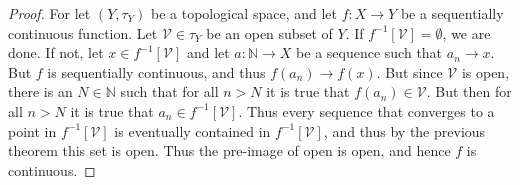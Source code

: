 \documentclass{article}                                                        %
\begin{document}
        \begin{proof}
            For let $(Y,\tau_{Y})$ be a topological space, and let
            $f:X\rightarrow{Y}$ be a sequentially continuous function. Let
            $\mathcal{V}\in\tau_{Y}$ be an open subset of $Y$. If
            $f^{\minus{1}}[\mathcal{V}]=\emptyset$, we are done. If not, let
            $x\in{f}^{\minus{1}}[\mathcal{V}]$ and let
            $a:\mathbb{N}\rightarrow{X}$ be a sequence such that
            $a_{n}\rightarrow{x}$. But $f$ is sequentially continuous, and thus
            $f(a_{n})\rightarrow{f}(x)$. But since $\mathcal{V}$ is open, there
            is an $N\in\mathbb{N}$ such that for all $n>N$ it is true that
            $f(a_{n})\in\mathcal{V}$. But then for all $n>N$ it is true that
            $a_{n}\in{f}^{\minus{1}}[\mathcal{V}]$. Thus every sequence that
            converges to a point in $f^{\minus{1}}[\mathcal{V}]$ is eventually
            contained in $f^{\minus{1}}[\mathcal{V}]$, and thus by the
            previous theorem this set is open. Thus the pre-image of open is
            open, and hence $f$ is continuous.
        \end{proof}
\end{document}
